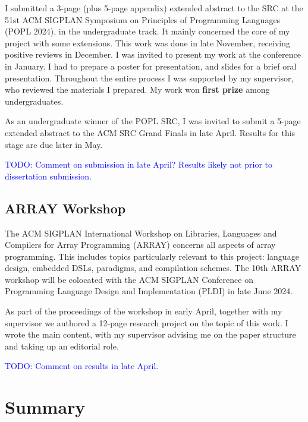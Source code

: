 I submitted a 3-page (plus 5-page appendix) extended abstract to the SRC at the 51st ACM SIGPLAN Symposium on Principles of Programming Languages (POPL 2024), in the undergraduate track.
It mainly concerned the core of my project with some extensions.
This work was done in late November, receiving positive reviews in December. 
I was invited to present my work at the conference in January. 
I had to prepare a poster for presentation, and slides for a brief oral presentation. 
Throughout the entire process I was supported by my supervisor, who reviewed the materials I prepared.
My work won \textbf{first prize} among undergraduates. 

As an undergraduate winner of the POPL SRC, I was invited to submit a 5-page extended abstract to the ACM SRC Grand Finals in late April. Results for this stage are due later in May.

\begin{center}
    \textcolor{blue}{TODO: Comment on submission in late April? Results likely not prior to dissertation submission. }
\end{center}

\subsection{ARRAY Workshop}

The ACM SIGPLAN International Workshop on Libraries, Languages and Compilers for Array Programming (ARRAY) concerns all aspects of array programming. 
This includes topics particularly relevant to this project: language design, embedded DSLs, paradigms, and compilation schemes.
The 10th ARRAY workshop will be colocated with the ACM SIGPLAN Conference on Programming Language Design and Implementation (PLDI) in late June 2024.

As part of the proceedings of the workshop in early April, together with my supervisor we authored a 12-page research project on the topic of this work. I wrote the main content, with my supervisor advising me on the paper structure and taking up an editorial role. 

\begin{center}
    \textcolor{blue}{TODO: Comment on results in late April.}
\end{center}


\newpage
\section{Summary}

